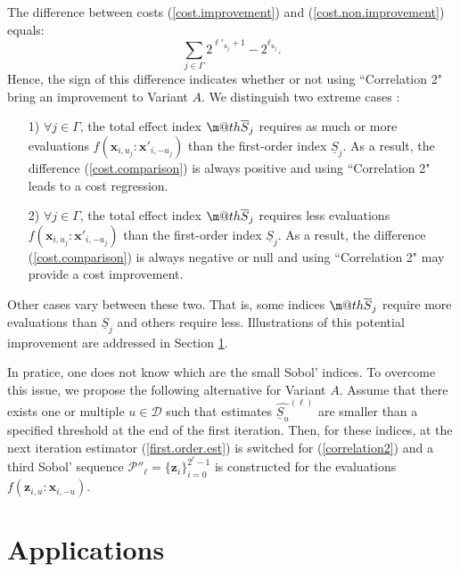 \documentclass[]{elsarticle}
\makeatletter
\theoremstyle{definition}
\newcommand{\bvec}[1]{\boldsymbol{#1}}
\newcommand{\vx}{\bvec{x}}
\newcommand{\vz}{\bvec{z}}
\newcommand*{\ov}[1]{
  \m@th\overline{\mbox{#1}\raisebox{2mm}{}}
}
\makeatother
\begin{document}
The difference between costs (\ref{cost.improvement}) and (\ref{cost.non.improvement}) equals:
\begin{equation}
 \sum \limits_{j \in \Gamma} 2^{\ell'_{u_j}+1} - 2^{\ell_{u_j}}.
\label{cost.comparison}
\end{equation}
Hence, the sign of this difference indicates whether or not using ``Correlation 2" bring an improvement to Variant $A$. We distinguish two extreme cases :
\begin{itemize}
\item[1)] $\forall j \in \Gamma$, the total effect index $\ov{$S$}_j$ requires as much or more evaluations $f\left(\vx_{i,u_j}:{\vx'}_{i,-u_j}\right)$ than the first-order index $\underline{S}_j$. As a result, the difference (\ref{cost.comparison}) is always positive and using ``Correlation 2" leads to a cost regression.
\item[2)] $\forall j \in \Gamma$, the total effect index $\ov{$S$}_j$ requires less evaluations $f\left(\vx_{i,u_j}:{\vx'}_{i,-u_j}\right)$ than the first-order index $\underline{S}_j$. As a result, the difference (\ref{cost.comparison}) is always negative or null and using ``Correlation 2" may provide a cost improvement.
\end{itemize}
Other cases vary between these two. That is, some indices $\ov{$S$}_j$ require more evaluations than $\underline{S}_j$ and others require less. Illustrations of this potential improvement are addressed in Section \ref{appli}. 
\bigskip

In pratice, one does not know which are the small Sobol' indices. To overcome this issue, we propose the following alternative for Variant $A$. Assume that there exists one or multiple  $u \in \mathcal{D}$ such that estimates $\widehat{\underline{S}_u}^{(\ell)}$ are smaller than a specified threshold at the end of the first iteration. Then, for these indices, at the next iteration estimator (\ref{first.order.est}) is switched for (\ref{correlation2}) and a third Sobol' sequence $\mathcal{P''}_{\ell}=\{\vz_i\}_{i=0}^{2^\ell-1}$ is constructed for the evaluations $f({\vz}_{i,u}:{\vx}_{i,-u})$.

\section{Applications}
\label{appli}
\end{document}
